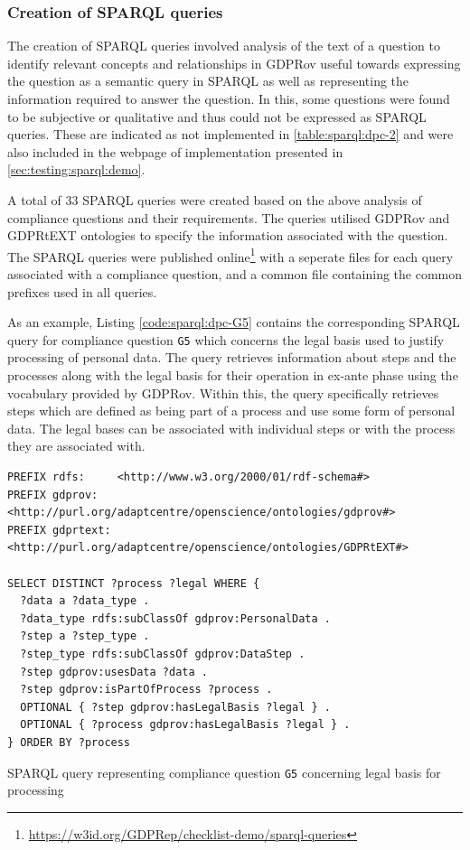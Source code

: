 \subsubsection{Creation of SPARQL queries}
The creation of SPARQL queries involved analysis of the text of a question to identify relevant concepts and relationships in GDPRov useful towards expressing the question as a semantic query in SPARQL as well as representing the information required to answer the question.
In this, some questions were found to be subjective or qualitative and thus could not be expressed as SPARQL queries. These are indicated as not implemented in \autoref{table:sparql:dpc-2} and were also included in the webpage of implementation presented in \autoref{sec:testing:sparql:demo}.

A total of 33 SPARQL queries were created based on the above analysis of compliance questions and their requirements.
The queries utilised GDPRov and GDPRtEXT ontologies to specify the information associated with the question.
The SPARQL queries were published online\footnote{\url{https://w3id.org/GDPRep/checklist-demo/sparql-queries}}
with a seperate files for each query associated with a compliance question, and a common file containing the common prefixes used in all queries.

As an example, Listing \autoref{code:sparql:dpc-G5} contains the corresponding SPARQL query for compliance question \texttt{G5} which concerns the legal basis used to justify processing of personal data. 
The query retrieves information about steps and the processes along with the legal basis for their operation in ex-ante phase using the vocabulary provided by GDPRov.
Within this, the query specifically retrieves steps which are defined as being part of a process and use some form of personal data. 
The legal bases can be associated with individual steps or with the process they are associated with.
\begin{listing}[ht]
\begin{verbatim}
PREFIX rdfs:     <http://www.w3.org/2000/01/rdf-schema#>
PREFIX gdprov:   <http://purl.org/adaptcentre/openscience/ontologies/gdprov#>
PREFIX gdprtext: <http://purl.org/adaptcentre/openscience/ontologies/GDPRtEXT#>

SELECT DISTINCT ?process ?legal WHERE {
  ?data a ?data_type .
  ?data_type rdfs:subClassOf gdprov:PersonalData .
  ?step a ?step_type .
  ?step_type rdfs:subClassOf gdprov:DataStep .
  ?step gdprov:usesData ?data . 
  ?step gdprov:isPartOfProcess ?process .
  OPTIONAL { ?step gdprov:hasLegalBasis ?legal } .
  OPTIONAL { ?process gdprov:hasLegalBasis ?legal } .
} ORDER BY ?process
\end{verbatim}
\caption{SPARQL query representing compliance question \texttt{G5} concerning legal basis for processing}
\label{code:sparql:dpc-G5}
\end{listing}

